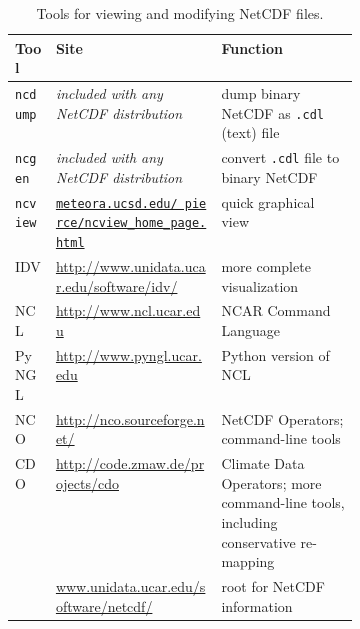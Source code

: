 \newcommand{\netcdftool}[1]{#1\index{NetCDF!tools!#1}}
\begin{table}[ht]
\centering
\small
\begin{tabular}{llp{0.4\linewidth}}
  \toprule
  \textbf{Tool} & \textbf{Site} & \textbf{Function} \\
  \midrule
  \netcdftool{\texttt{ncdump}} & \emph{included with any NetCDF distribution} & dump binary NetCDF as \texttt{.cdl} (text) file \\
  \netcdftool{\texttt{ncgen}} & \emph{included with any NetCDF distribution} & convert \texttt{.cdl} file to binary NetCDF \\
  \netcdftool{\texttt{ncview}} & \href{http://meteora.ucsd.edu/~pierce/ncview_home_page.html}{\texttt{meteora.ucsd.edu/~pierce/ncview_home_page.html}} & quick graphical view \\
  \netcdftool{IDV} & \url{http://www.unidata.ucar.edu/software/idv/} & more complete visualization \\
  \netcdftool{NCL} &  \url{http://www.ncl.ucar.edu} & NCAR Command Language\\
  \netcdftool{PyNGL} &  \url{http://www.pyngl.ucar.edu} & Python version of NCL\\
  \netcdftool{NCO}\index{NCO (NetCDF Operators)} & \url{http://nco.sourceforge.net/} & NetCDF Operators; command-line tools\\
  \netcdftool{CDO} & \url{http://code.zmaw.de/projects/cdo} & Climate Data Operators; more command-line tools, including conservative re-mapping \\
  & \url{www.unidata.ucar.edu/software/netcdf/} & root for NetCDF information \\
  \bottomrule
\end{tabular}
\normalsize
\caption{Tools for viewing and modifying NetCDF files.}
\label{tab:NetCDFview}
\end{table}





